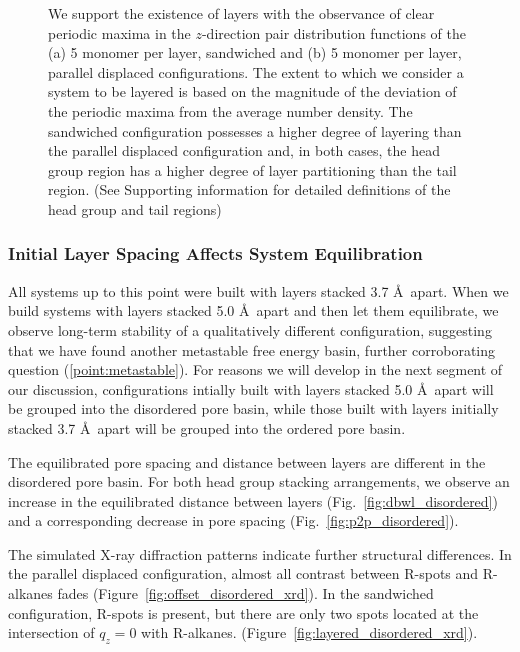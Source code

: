 \documentclass[journal=jpcbfk,manusciprt=article]{achemso}
\begin{document}
\begin{figure}
\begin{subfigure}{0.45\textwidth}
                \caption{}\label{fig:zdf_offset}
        \end{subfigure}
	\caption{We support the existence of layers with the observance of
		clear periodic maxima in the $z$-direction pair distribution functions of the
		(a) 5 monomer per layer, sandwiched and (b) 5 monomer per layer, parallel
		displaced configurations. The extent to which we consider a system to be
		layered is based on the magnitude of the deviation of the periodic maxima from
		the average number density. The sandwiched configuration possesses a higher
		degree of layering than the parallel displaced configuration and, in both
		cases, the head group region has a higher degree of layer partitioning than the
		tail region. (See Supporting information for detailed definitions of the head
		group and tail regions)}\label{fig:zdf}
  \end{figure}

  \subsubsection{Initial Layer Spacing Affects System Equilibration}

  All systems up to this point were built with layers stacked 3.7 \AA~apart.
  When we build systems with layers stacked 5.0 \AA~apart and then let them
  equilibrate, we observe long-term stability of a qualitatively different
  configuration, suggesting that we have found another metastable free energy
  basin, further corroborating question (\ref{point:metastable}). 
  For reasons we will develop in the next segment of our
  discussion, configurations intially built with layers stacked 5.0 \AA~apart 
  will be grouped into the disordered pore basin, while those built with layers
  initially stacked 3.7 \AA~apart will be grouped into the ordered pore basin.

  The equilibrated pore spacing and distance between layers are different in
  the disordered pore basin. For both head group stacking arrangements, we
  observe an increase in the equilibrated distance between layers
  (Fig.~\ref{fig:dbwl_disordered}) and a corresponding decrease in pore spacing
  (Fig.~\ref{fig:p2p_disordered}).

  The simulated X-ray diffraction patterns indicate further structural
  differences. In the parallel displaced configuration, almost all contrast
  between R-spots and R-alkanes fades (Figure~\ref{fig:offset_disordered_xrd}).
  In the sandwiched configuration, R-spots is present, but there are only two
  spots located at the intersection of $q_z=0$ with R-alkanes.
  (Figure~\ref{fig:layered_disordered_xrd}). 
\end{document}
